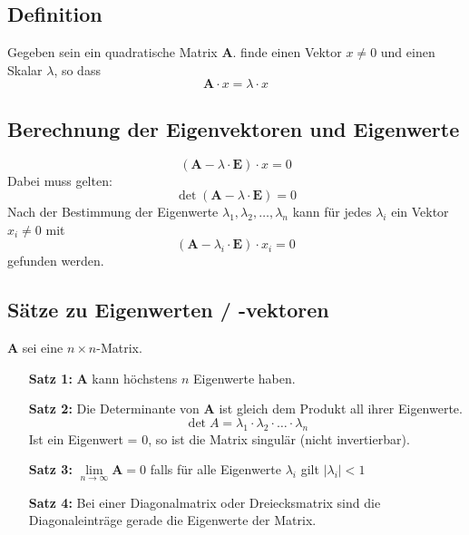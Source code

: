 \subsection{Definition}
Gegeben sein ein quadratische Matrix \textbf{A}. finde einen Vektor $x\neq 0$ und einen
Skalar $\lambda$, so dass
\[ \textbf{A} \cdot x = \lambda \cdot x \]

\subsection{Berechnung der Eigenvektoren und Eigenwerte}
\[ (\textbf{A}-\lambda\cdot\textbf{E})\cdot x=0 \]
Dabei muss gelten:
\[ \det(\textbf{A}-\lambda\cdot\textbf{E}) = 0 \]
Nach der Bestimmung der Eigenwerte $\lambda_1,\lambda_2,\ldots,\lambda_n$ kann für
jedes $\lambda_i$ ein Vektor $x_i\neq 0$ mit
\[ (\textbf{A}-\lambda_i\cdot\textbf{E}) \cdot x_i = 0 \]
gefunden werden.

\subsection{Sätze zu Eigenwerten / -vektoren}
\textbf{A} sei eine $n\times n$-Matrix.\\
\begin{itemize}
\item[\textbf{Satz 1:}] \textbf{A} kann höchstens $n$ Eigenwerte haben.\\
\item[\textbf{Satz 2:}] Die Determinante von \textbf{A} ist gleich dem Produkt all ihrer
	Eigenwerte. \[ \det A =  \lambda_1 \cdot \lambda_2 \cdot \ldots \cdot \lambda_n \]
Ist ein Eigenwert = 0, so ist die Matrix singulär (nicht invertierbar).
\item[\textbf{Satz 3:}] $\lim\limits_{n\rightarrow\infty}\textbf{A}=0$ falls für alle
	Eigenwerte $\lambda_i$ gilt $|\lambda_i|<1$
\item[\textbf{Satz 4:}] Bei einer Diagonalmatrix oder Dreiecksmatrix sind die
	Diagonaleinträge gerade die Eigenwerte der Matrix.
\end{itemize}